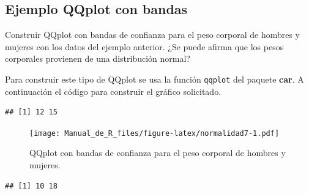 \documentclass[10pt,]{krantz}
\makeatletter
\newenvironment{Shaded}{\begin{snugshade}}{\end{snugshade}}
\newcommand{\KeywordTok}[1]{\textcolor[rgb]{0.13,0.29,0.53}{\textbf{#1}}}
\newcommand{\DataTypeTok}[1]{\textcolor[rgb]{0.13,0.29,0.53}{#1}}
\newcommand{\DecValTok}[1]{\textcolor[rgb]{0.00,0.00,0.81}{#1}}
\newcommand{\StringTok}[1]{\textcolor[rgb]{0.31,0.60,0.02}{#1}}
\newcommand{\OperatorTok}[1]{\textcolor[rgb]{0.81,0.36,0.00}{\textbf{#1}}}
\newcommand{\NormalTok}[1]{#1}
\newenvironment{kframe}{%
\medskip{}
\setlength{\fboxsep}{.8em}
 \def\at@end@of@kframe{}%
 \ifinner\ifhmode%
  \def\at@end@of@kframe{\end{minipage}}%
  \begin{minipage}{\columnwidth}%
 \fi\fi%
 \def\FrameCommand##1{\hskip\@totalleftmargin \hskip-\fboxsep
 \colorbox{shadecolor}{##1}\hskip-\fboxsep
     \hskip-\linewidth \hskip-\@totalleftmargin \hskip\columnwidth}%
 \MakeFramed {\advance\hsize-\width
   \@totalleftmargin\z@ \linewidth\hsize
   \@setminipage}}%
 {\par\unskip\endMakeFramed%
 \at@end@of@kframe}
\renewenvironment{Shaded}{\begin{kframe}}{\end{kframe}}
\makeatother
\begin{document}
\subsection*{Ejemplo QQplot con bandas}\label{ejemplo-qqplot-con-bandas}


Construir QQplot con bandas de confianza para el peso corporal de
hombres y mujeres con los datos del ejemplo anterior. ¿Se puede afirma
que los pesos corporales provienen de una distribución normal?

Para construir este tipo de QQplot se usa la función \texttt{qqplot} del
paquete \textbf{car}. A continuación el código para construir el gráfico
solicitado.

\begin{Shaded}
\end{Shaded}

\begin{verbatim}
## [1] 12 15
\end{verbatim}

\begin{Shaded}
\end{Shaded}

\begin{figure}
\centering
\texttt{[image: Manual\_de\_R\_files/figure-latex/normalidad7-1.pdf]}
\caption{\label{fig:normalidad7}QQplot con bandas de confianza para el peso
corporal de hombres y mujeres.}
\end{figure}

\begin{verbatim}
## [1] 10 18
\end{verbatim}
\end{document}
